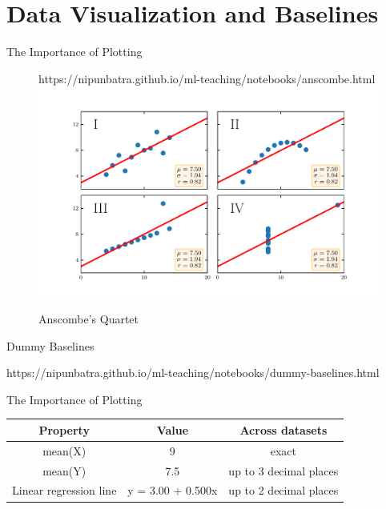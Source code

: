 \documentclass[usenames,dvipsnames]{beamer}
\begin{document}



\section{Data Visualization and Baselines}

\begin{frame}{The Importance of Plotting}
    \begin{figure}[htp]
      \centering
      \begin{notebookbox}{https://nipunbatra.github.io/ml-teaching/notebooks/anscombe.html}
        \includegraphics[width=\linewidth]{../assets/accuracy-convention/figures/anscombe.pdf}
      \end{notebookbox}
      \caption{Anscombe’s Quartet}
    \end{figure}
  \end{frame}

  \begin{frame}{Dummy Baselines}
	\begin{notebookbox}{https://nipunbatra.github.io/ml-teaching/notebooks/dummy-baselines.html}
	  \end{notebookbox}
\end{frame}

\begin{frame}{The Importance of Plotting}
\begin{tabular}{|c|c|c|}
\hline 
Property & Value & Across datasets \\ 
\hline 
mean(X) & 9 & exact \\ 
mean(Y) & 7.5 & up to 3 decimal places \\ 
Linear regression line & 	y = 3.00 + 0.500x & up to 2 decimal places \\ 
\hline 
\end{tabular} 


\end{frame}
\end{document}

